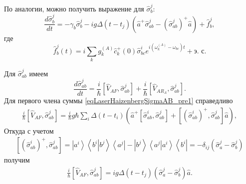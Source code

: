 По аналогии, можно получить выражение для $\hat{\sigma}_b^j$:
\begin{equation}
\frac{d \hat{\sigma}_b^j}{d t} = 
- \gamma_{b} \hat{\sigma}_{b}^{j} -
i g 
\Delta\left(t - t_j\right) 
 \left(
\hat{a}^{+}\hat{\sigma}^{j}_{ab} -
\left(\hat{\sigma}^{j}_{ab}\right)^{+}\hat{a}
\right) + \hat{f}_{b}^{j},
\label{eqLaserHaizenbergSigmaBJ}
\end{equation}
где
\begin{equation}
\hat{f}_{b}^{j}\left(t\right) = i
\sum_{k}
g_k^{(A)}
\hat{c}_k^{+}\left(0\right)\hat{\sigma}^{i}_{bc}  
e^{i\left(\omega_k^{(A)} - \omega_{bc}\right)t} + \mbox{э. с.}
\label{eqLaserHaizenbergFBJ}
\end{equation}

Для $\hat{\sigma}^{j}_{ab}$ имеем
\begin{equation}
\frac{d \hat{\sigma}_{ab}^j}{d t} = 
\frac{i}{\hbar}
\left[\hat{V}_{AF}, \hat{\sigma}_{ab}^j\right] + 
\frac{i}{\hbar}
\left[\hat{V}_{AR_A}, \hat{\sigma}_{ab}^j\right].
\label{eqLaserHaizenbergSigmaAB_pre1}
\end{equation}
Для первого члена суммы \eqref{eqLaserHaizenbergSigmaAB_pre1} справедливо
\begin{eqnarray}
\frac{i}{\hbar}
\left[\hat{V}_{AF}, \hat{\sigma}_{ab}^j\right] = 
 \frac{i}{\hbar} g \hbar
\sum_i
\Delta\left(t - t_i\right) 
 \left(
\hat{a}^{+}\left[\hat{\sigma}^{i}_{ab},\hat{\sigma}_{ab}^j\right]  +
\left[\left(\hat{\sigma}^{i}_{ab}\right)^{+},\hat{\sigma}_{ab}^j\right]
\hat{a}
\right),
\nonumber
\end{eqnarray}
Откуда с учетом 
\begin{eqnarray}
\left[\left(\hat{\sigma}^{i}_{ab}\right)^{+},\hat{\sigma}_{ab}^j\right] = 
\left|a^i\right>\left<b^i\right|\left.b^j\right>\left<a^j\right| -
\left|b^j\right>\left<a^j\right|\left.a^i\right>\left<b^i\right| = 
- \delta_{ij}\left(\hat{\sigma}^{j}_{a} - \hat{\sigma}^{j}_{b}\right)
\nonumber
\end{eqnarray}
получим
\begin{eqnarray}
\frac{i}{\hbar}
\left[\hat{V}_{AF}, \hat{\sigma}_{ab}^j\right] = 
i g 
\Delta\left(t - t_j\right) 
\left(\hat{\sigma}^{j}_{a} -
\hat{\sigma}^{j}_{b}\right)\hat{a}.
\label{eqLaserHaizenbergSigmaAB_pre1_1}
\end{eqnarray}

